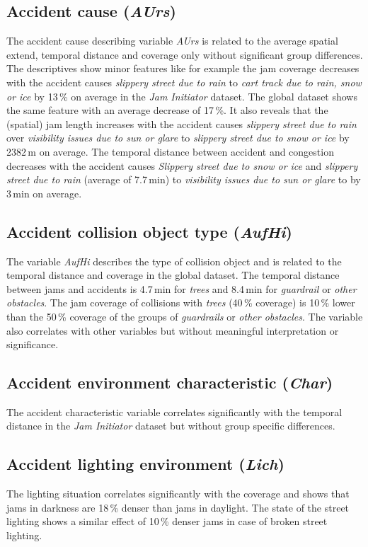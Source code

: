 \subsection{Accident cause (\textit{AUrs})}
\label{analysis_sum_AUrs}
The accident cause describing variable \textit{AUrs} is related to the average spatial extend, temporal distance and coverage only without significant group differences. The descriptives show minor features like for example the jam coverage decreases with the accident causes \textit{slippery street due to rain} to \textit{cart track due to rain, snow or ice} by 13\,\% on average in the \textit{Jam Initiator} dataset. The global dataset shows the same feature with an average decrease of 17\,\%. It also reveals that the (spatial) jam length increases with the accident causes \textit{slippery street due to rain} over \textit{visibility issues due to sun or glare} to \textit{slippery street due to snow or ice} by 2382\,m on average. The temporal distance between accident and congestion decreases with the accident causes \textit{Slippery street due to snow or ice} and \textit{slippery street due to rain} (average of 7.7\,min) to \textit{visibility issues due to sun or glare} to by 3\,min on average.

\subsection{Accident collision object type (\textit{AufHi})}
\label{analysis_sum_AufHi}
The variable \textit{AufHi} describes the type of collision object and is related to the temporal distance and coverage in the global dataset. The temporal distance between jams and accidents is 4.7\,min for \textit{trees} and 8.4\,min for \textit{guardrail} or \textit{other obstacles}. The jam coverage of collisions with \textit{trees} (40\,\% coverage) is 10\,\% lower than the 50\,\% coverage of the groups of \textit{guardrails} or \textit{other obstacles}. The variable also correlates with other variables but without meaningful interpretation or significance.

\subsection{Accident environment characteristic (\textit{Char})}
\label{analysis_sum_Char}
The accident characteristic variable correlates significantly with the temporal distance in the \textit{Jam Initiator} dataset but without group specific differences.

\subsection{Accident lighting environment (\textit{Lich})}
\label{analysis_sum_Lich}
The lighting situation correlates significantly with the coverage and shows that jams in darkness are 18\,\% denser than jams in daylight. The state of the street lighting shows a similar effect of 10\,\% denser jams in case of broken street lighting.


